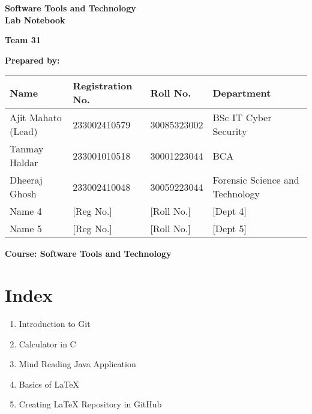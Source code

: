 \begin{titlepage}
    \centering
    \vspace*{2cm}
    
    {\Huge\bfseries Software Tools and Technology \\[0.4cm] Lab Notebook \\[2cm]}
    
    {\Large\textbf{Team 31}\\[1.5cm]}
    
    \vspace{0.5cm}
    \textbf{Prepared by:}\\[0.5cm]
    
    \vspace{1cm}
    \begin{tabular}{|l|l|l|l|}
    \hline
    \textbf{Name} & \textbf{Registration No.} & \textbf{Roll No.} & \textbf{Department} \\
    \hline
     Ajit Mahato (Lead)& 233002410579& 30085323002& BSc IT Cyber Security\\
    Tanmay Haldar &233001010518 & 30001223044 & BCA \\
    Dheeraj Ghosh & 233002410048 & 30059223044 & Forensic Science and Technology \\
    Name 4 & [Reg No.] & [Roll No.] & [Dept 4] \\
    Name 5 & [Reg No.] & [Roll No.] & [Dept 5] \\
    \hline
    \end{tabular}
    
    \vspace{2cm}
    
    \vfill
    \textbf{Course: Software Tools and Technology}
    
\end{titlepage}

\newpage
\chapter*{Index}
\thispagestyle{empty} %

\begin{enumerate}
    \item Introduction to Git
    \item Calculator in C\dotfill 
    \item Mind Reading Java Application\dotfill 
    \item Basics of LaTeX\dotfill 
    \item Creating LaTeX Repository in GitHub\dotfill 
\end{enumerate}
